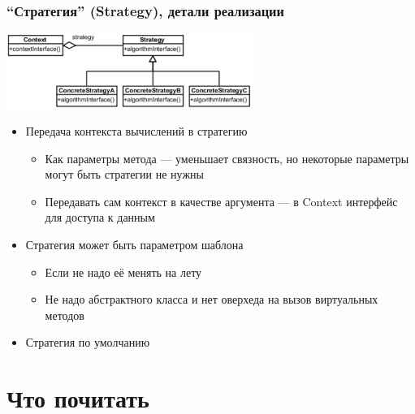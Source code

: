 \documentclass{../../slides-style}
\begin{document}
    \begin{frame}
        \frametitle{\enquote{Стратегия} (Strategy), детали реализации}
        \begin{center}
            \includegraphics[width=0.6\textwidth]{strategy.png}
        \end{center}
        \begin{itemize}
            \item Передача контекста вычислений в стратегию
            \begin{itemize}
                \item Как параметры метода --- уменьшает связность, но некоторые параметры могут быть стратегии не нужны
                \item Передавать сам контекст в качестве аргумента --- в Context интерфейс для доступа к данным
            \end{itemize}
            \item Стратегия может быть параметром шаблона
            \begin{itemize}
                \item Если не надо её менять на лету
                \item Не надо абстрактного класса и нет оверхеда на вызов виртуальных методов
            \end{itemize}
            \item Стратегия по умолчанию
        \end{itemize}
    \end{frame}

    \section{Что почитать}
\end{document}

